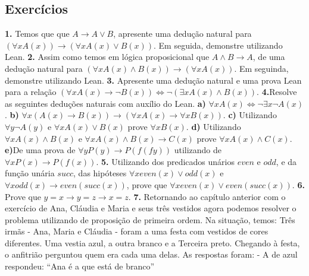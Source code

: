 \subsection{Exercícios}
\textbf{1.} Temos que 
que $A \to A \lor B$, apresente uma dedução natural 
para $(\forall x A (x)) \to (\forall x A(x)\lor B(x))$. Em seguida,
demonstre utilizando Lean.
\newline \textbf{2.} Assim como temos em lógica proposicional
 que $A \land B \to A$, de uma dedução natural para 
 $(\forall x A (x) \land B(x)) \to (\forall x A(x))$. Em seguinda,
 demonstre utilizando Lean.
\newline \textbf{3.} Apresente uma dedução natural e uma
prova Lean para a relação $(\forall x A(x) \to \neg B(x)) \iff \neg (\exists x A(x) \land B(x))$.
 \newline \textbf{4.}Resolve as seguintes deduções naturais com auxílio do Lean.
\newline \textbf{a)} $\forall x A(x) \iff \neg \exists x \neg A(x)$.
\newline \textbf{b)} $\forall x(A(x) \to B(x)) \to (\forall x A(x) \to \forall x B(x))$.
\newline \textbf{c)} Utilizando $\forall y \neg A (y)$ e $\forall x A(x)
\lor B(x)$ prove $\forall x B(x)$.
\newline \textbf{d)} Utilizando $\forall x A(x) \land B(x)$ e 
$\forall x A(x) \land B(x) \to C(x)$ prove $\forall x A(x) \land C(x)$.
\newline \textbf{e)}De uma prova de $\forall y P(y) \to P(f (f y))$ utilizando 
de $\forall x P(x) \to P(f(x))$.
\newline \textbf{5.} Utilizando dos predicados unários 
$even$ e $odd$, e da função unária $succ$, das hipóteses
$\forall x even(x) \lor odd(x)$ e $\forall x odd(x) \to even(succ(x))$,
prove que $\forall x even(x) \lor even(succ(x))$.
\newline \textbf{6.} Prove que $y = x → y = z → x = z$.
\newline \textbf{7.} Retornando ao capítulo anterior com o exercício de Ana, Cláudia e Maria e seus três vestidos
agora podemos resolver o problema utilizando de proposição de primeira ordem. Na situação, temos: 
\newline Três irmãs - Ana, Maria e Cláudia - foram a uma festa com vestidos de
cores diferentes. Uma vestia azul, a outra branco e a Terceira
preto. Chegando à festa, o anfitrião perguntou quem era cada uma
delas. As respostas foram:
\newline - A de azul respondeu: “Ana é a que está de branco”
